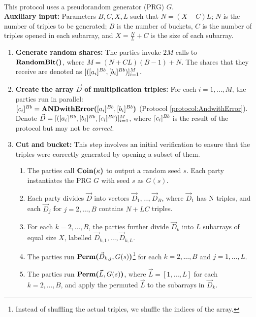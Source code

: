 \label{protocol:preprocessing}
\begin{protocol}
    \\
    This protocol uses a pseudorandom generator (PRG) $G$.\\
    {\bf Auxiliary input:} Parameters $B, C, X, L$ such that $N = (X - C)L$; $N$ is the number of triples to be generated; $B$ is the number of buckets, $C$ is the number of triples opened in each subarray, and $X = \frac{N}{L} + C$ is the size of each subarray.
    \begin{enumerate}
        \item {\bf Generate random shares:} The parties invoke $2M$ calls to \\ $\textbf{RandomBit()}{}$, where $M = (N + CL)(B - 1) + N$. The shares that they receive are denoted as $[([a_i]^{Bb}, [b_i]^{Bb})]_{i = 1}^{M}$.
	\item {\bf Create the array $\vec{D}$ of multiplication triples:} For each $i = 1, \ldots, M$, the parties run in parallel:\\
		$[c_i]^{Bb} = \textbf{ANDwithError(}[a_i]^{Bb},[b_i]^{Bb}\textbf{)}$ (Protocol \ref{protocol:AndwithError}).\\
        Denote $\vec{D} = [([a_i]^{Bb}, [b_i]^{Bb}, [c_i]^{Bb})]_{i = 1}^{M}$, where $[c_i]^{Bb}$ is the result of the protocol but may not be \emph{correct}.
        \item {\bf Cut and bucket:} This step involves an initial verification to ensure that the triples were correctly generated by opening a subset of them.
        \begin{enumerate}
            \item The parties call $\textbf{Coin(}\kappa\textbf{)}$ to output a random seed $s$. 
            Each party instantiates the PRG $G$ with seed $s$ as $G(s)$. 
            \item Each party divides $\vec{D}$ into vectors $\vec{D}_1, \ldots, \vec{D}_B$, where $\vec{D}_1$ has N triples, and each $\vec{D}_j$ for $j = 2, \ldots, B$ contains $N + LC$ triples.
            \item For each $k = 2, \ldots, B$, the parties further divide $\vec{D}_k$ into $L$ subarrays of equal size $X$, labelled $\vec{D}_{k, 1}, \ldots, \vec{D}_{k, L}$.
            \item The parties run $\textbf{Perm(}\vec{D}_{k, j},G(s)\textbf{)}$\footnote{Instead of shuffling the actual triples, we shuffle the indices of the array.} for each $k = 2, \ldots, B$ and $j = 1, \ldots, L$.
            \item The parties run $\textbf{Perm(}\vec{L},G(s)\textbf{)}$, where $\vec{L} = [1, \ldots, L]$ for each $k = 2, \ldots, B$, and apply the permuted $\vec{L}$ to the subarrays in $\vec{D}_k$.

\end{enumerate}
\end{enumerate}
\end{protocol}
